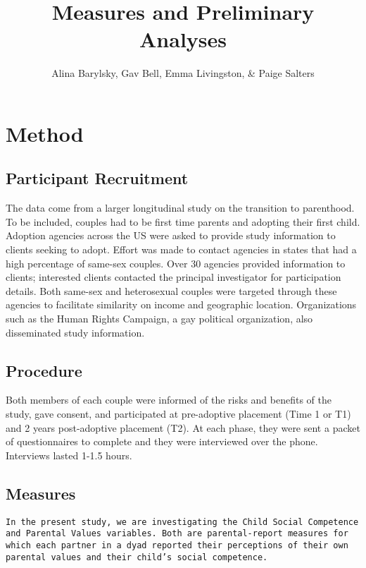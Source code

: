 \documentclass[man]{apa6}
\title{Measures and Preliminary Analyses}
\author{Alina Barylsky, Gav Bell, Emma Livingston, \& Paige Salters}
\date{}
\affiliation{
\vspace{0.5cm}
}
\begin{document}
\maketitle

\hypertarget{method}{%
\section{Method}\label{method}}

\hypertarget{participant-recruitment}{%
\subsection{Participant Recruitment}\label{participant-recruitment}}

The data come from a larger longitudinal study on the transition to parenthood. To be included, couples had to be first time parents and adopting their first child. Adoption agencies across the US were asked to provide study information to clients seeking to adopt. Effort was made to contact agencies in states that had a high percentage of same-sex couples. Over 30 agencies provided information to clients; interested clients contacted the principal investigator for participation details. Both same-sex and heterosexual couples were targeted through these agencies to facilitate similarity on income and geographic location. Organizations such as the Human Rights Campaign, a gay political organization, also disseminated study information.

\hypertarget{procedure}{%
\subsection{Procedure}\label{procedure}}

Both members of each couple were informed of the risks and benefits of the study, gave consent, and participated at pre-adoptive placement (Time 1 or T1) and 2 years post-adoptive placement (T2). At each phase, they were sent a packet of questionnaires to complete and they were interviewed over the phone. Interviews lasted 1-1.5 hours.

\hypertarget{measures}{%
\subsection{Measures}\label{measures}}

\begin{verbatim}
In the present study, we are investigating the Child Social Competence and Parental Values variables. Both are parental-report measures for which each partner in a dyad reported their perceptions of their own parental values and their child’s social competence. 
\end{verbatim}
\end{document}
